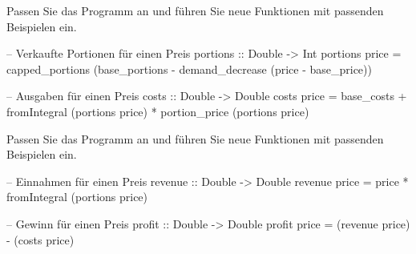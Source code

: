 \addtocounter{exercise}{-1}\addtocounter{solve}{-1}%
\begin{frame}
    \begin{exercise}[c)]
        Passen Sie das Programm an und führen Sie neue Funktionen mit passenden Beispielen ein.
    \end{exercise}
    \begin{solve}
    \begin{plainhaskell}
-- Verkaufte Portionen für einen Preis
portions :: Double -> Int
portions price = capped_portions (base_portions - demand_decrease (price - base_price))

-- Ausgaben für einen Preis
costs :: Double -> Double
costs price = base_costs + fromIntegral (portions price) * portion_price (portions price)
    \end{plainhaskell}
    \end{solve}
\end{frame}
\addtocounter{exercise}{-1}\addtocounter{solve}{-1}%
\begin{frame}
    \begin{exercise}[c)]
        Passen Sie das Programm an und führen Sie neue Funktionen mit passenden Beispielen ein.
    \end{exercise}
    \begin{solve}
    \begin{plainhaskell}
-- Einnahmen für einen Preis 
revenue :: Double -> Double
revenue price = price * fromIntegral (portions price)

-- Gewinn für einen Preis
profit :: Double -> Double
profit price = (revenue price) - (costs price)
    \end{plainhaskell}
    \end{solve}
\end{frame}